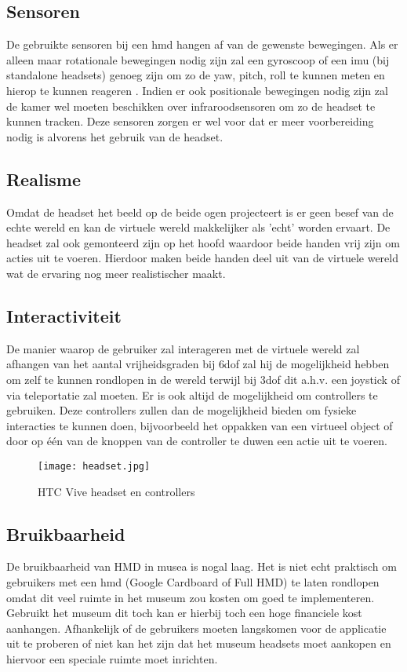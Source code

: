 \subsection{Sensoren}
De gebruikte sensoren bij een \acrshort{hmd} hangen af van de gewenste bewegingen. Als er alleen maar rotationale bewegingen nodig zijn zal een gyroscoop of een \acrfull{imu} (bij standalone headsets) genoeg zijn om zo de yaw, pitch, roll te kunnen meten en hierop te kunnen reageren \autocite{LaValle2014}. Indien er ook positionale bewegingen nodig zijn zal de kamer wel moeten beschikken over infraroodsensoren om zo de headset te kunnen tracken. Deze sensoren zorgen er wel voor dat er meer voorbereiding nodig is alvorens het gebruik van de headset.
\subsection{Realisme}
Omdat de headset het beeld op de beide ogen projecteert is er geen besef van de echte wereld en kan de virtuele wereld makkelijker als 'echt' worden ervaart. De headset zal ook gemonteerd zijn op het hoofd waardoor beide handen vrij zijn om acties uit te voeren. Hierdoor maken beide handen deel uit van de virtuele wereld wat de ervaring nog meer realistischer maakt.
\subsection{Interactiviteit}
De manier waarop de gebruiker zal interageren met de virtuele wereld zal afhangen van het aantal vrijheidsgraden bij \acrshort{6dof} zal hij de mogelijkheid hebben om zelf te kunnen rondlopen in de wereld terwijl bij \acrshort{3dof} dit a.h.v. een joystick of via teleportatie zal moeten. Er is ook altijd de mogelijkheid om controllers te gebruiken. Deze controllers zullen dan de mogelijkheid bieden om fysieke interacties te kunnen doen, bijvoorbeeld het oppakken van een virtueel object of door op één van de knoppen van de controller te duwen een actie uit te voeren.

\begin{figure}
    \texttt{[image: headset.jpg]}
    \caption{HTC Vive headset en controllers}
    \label{fig:htcvive}
\end{figure}

\subsection{Bruikbaarheid}
De bruikbaarheid van HMD in musea is nogal laag. Het is niet echt praktisch om gebruikers met een \acrshort{hmd} (Google Cardboard of Full HMD) te laten rondlopen omdat dit veel ruimte in het museum zou kosten om goed te implementeren. Gebruikt het museum dit toch kan er hierbij toch een hoge financiele kost aanhangen. Afhankelijk of de gebruikers moeten langskomen voor de applicatie uit te proberen of niet kan het zijn dat het museum headsets moet aankopen en hiervoor een speciale ruimte moet inrichten.

